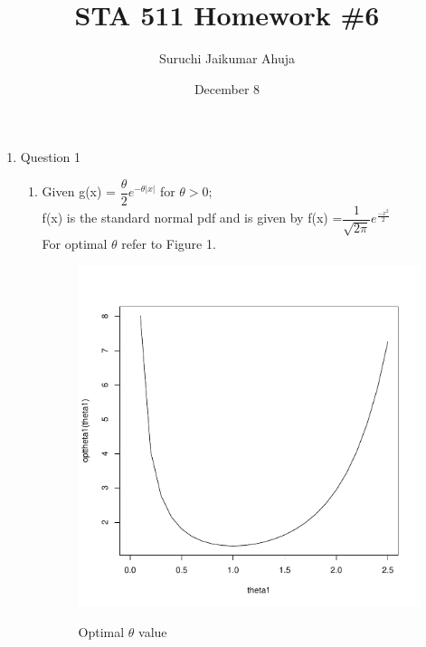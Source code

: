 \documentclass[11pt]{article}
\begin{document}
	\title{STA 511 Homework \#6}
	\date{December 8}
	\author{Suruchi Jaikumar Ahuja}
	\maketitle
	\renewcommand{\thefootnote}{\arabic{footnote}}

\begin{enumerate}

\item Question 1
\begin{enumerate}

\item Given g(x) = ${\dfrac{\theta}{2} }e^{-\theta|x|}$ for $\theta > 0$;\\
f(x) is the standard normal pdf and is given by f(x) =$ \dfrac{1}{\sqrt{2\pi}} e^\frac{-x^2}{2}$\\
For optimal $\theta$ refer to Figure 1.\footnotemark 
			 \\

\begin{figure}[h]
	\caption[Figure1]{Optimal $\theta$ value}
    \centering
     \includegraphics[scale=0.4]{1q.pdf}
      \label{fig1}			
\end{figure}


\end{enumerate}
\end{enumerate}
\end{document}
